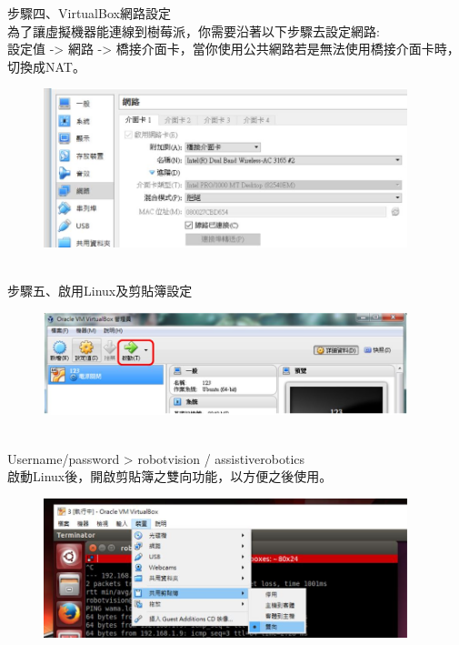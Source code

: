 \documentclass{article}
\begin{document}
步驟四、VirtualBox網路設定
\\為了讓虛擬機器能連線到樹莓派，你需要沿著以下步驟去設定網路: 
\\設定值 -> 網路 -> 橋接介面卡，當你使用公共網路若是無法使用橋接介面卡時，切換成NAT。
\begin{figure}[htp]
    \begin{center}
        \includegraphics[width=300pt]{pic/圖片6.jpg}
    \end{center}
\end{figure}
\\步驟五、啟用Linux及剪貼簿設定
\begin{figure}[htp]
    \begin{center}
        \includegraphics[width=300pt]{pic/圖片7.jpg}
    \end{center}
\end{figure}
\\Username/password > robotvision / assistiverobotics
\\啟動Linux後，開啟剪貼簿之雙向功能，以方便之後使用。
\begin{figure}[htp]
    \begin{center}
        \includegraphics[width=300pt]{pic/圖片8.jpg}
    \end{center}
\end{figure}
\end{document}
